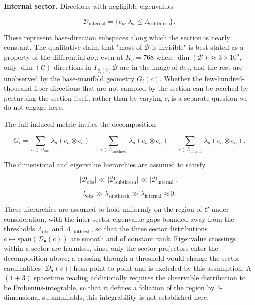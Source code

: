 \documentclass[11pt]{article}
\begin{document}
\textbf{Internal sector.} Directions with negligible eigenvalues

\begin{equation}
\mathcal{D}_{\text{internal}} = \{e_a : \lambda_a \leq \Lambda_{\text{subthresh}}\}.
\end{equation}

These represent base-direction subspaces along which the section is nearly constant. The qualitative claim that "most of $\mathcal{B}$ is invisible" is best stated as a property of the differential $d\sigma_i$: even at $K_q = 768$ where $\dim(\mathcal{B}) \approx 3\times 10^5$, only $\dim(\mathcal{C})$ directions in $T_{q_i(c)}\mathcal{B}$ are in the image of $d\sigma_i$, and the rest are unobserved by the base-manifold geometry $G_i(c)$. Whether the few-hundred-thousand fiber directions that are not sampled by the section can be reached by perturbing the section itself, rather than by varying $c$, is a separate question we do not engage here.

The full induced metric invites the decomposition

\begin{equation}
G_i = \sum_{a \in \mathcal{D}_{\text{obs}}} \lambda_a (e_a \otimes e_a)
+ \sum_{a \in \mathcal{D}_{\text{subthresh}}} \lambda_a (e_a \otimes e_a)
+ \sum_{a \in \mathcal{D}_{\text{internal}}} \lambda_a (e_a \otimes e_a).
\end{equation}

The dimensional and eigenvalue hierarchies are assumed to satisfy

\begin{equation}
|\mathcal{D}_{\text{obs}}| \ll |\mathcal{D}_{\text{subthresh}}| \ll |\mathcal{D}_{\text{internal}}|,
\end{equation}

\begin{equation}
\lambda_{\text{obs}} \gg \lambda_{\text{subthresh}} \gg \lambda_{\text{internal}} \approx 0.
\end{equation}

These hierarchies are assumed to hold uniformly on the region of $\mathcal{C}$ under consideration, with the inter-sector eigenvalue gaps bounded away from the thresholds $\Lambda_{\text{obs}}$ and $\Lambda_{\text{subthresh}}$, so that the three sector distributions $c \mapsto \mathrm{span}(\mathcal{D}_{\bullet}(c))$ are smooth and of constant rank. Eigenvalue crossings within a sector are harmless, since only the sector projectors enter the decomposition above; a crossing through a threshold would change the sector cardinalities $|\mathcal{D}_{\bullet}(c)|$ from point to point and is excluded by this assumption. A $(1+3)$ spacetime reading additionally requires the observable distribution to be Frobenius-integrable, so that it defines a foliation of the region by 4-dimensional submanifolds; this integrability is not established here.
\end{document}
